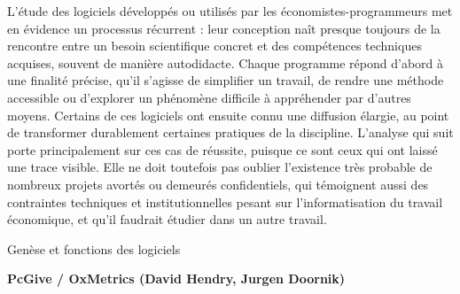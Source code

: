 L’étude des logiciels développés ou utilisés par les économistes-programmeurs met en évidence un processus récurrent : leur conception naît presque toujours de la rencontre entre un besoin scientifique concret et des compétences techniques acquises, souvent de manière autodidacte. Chaque programme répond d’abord à une finalité précise, qu’il s’agisse de simplifier un travail, de rendre une méthode accessible ou d’explorer un phénomène difficile à appréhender par d’autres moyens. Certains de ces logiciels ont ensuite connu une diffusion élargie, au point de transformer durablement certaines pratiques de la discipline. L’analyse qui suit porte principalement sur ces cas de réussite, puisque ce sont ceux qui ont laissé une trace visible. Elle ne doit toutefois pas oublier l’existence très probable de nombreux projets avortés ou demeurés confidentiels, qui témoignent aussi des contraintes techniques et institutionnelles pesant sur l’informatisation du travail économique, et qu'il faudrait étudier dans un autre travail.

Genèse et fonctions des logiciels


\textbf{PcGive / OxMetrics (David Hendry, Jurgen Doornik)}

